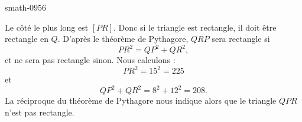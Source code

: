 
\begin{corrige}{smath-0956}

    Le côté le plus long est \( [PR]\). Donc si le triangle est rectangle, il doit être rectangle en \( Q\). D'après le théorème de Pythagore, \( QRP\) sera rectangle si 
    \begin{equation}
        PR^2=QP^2+QR^2,
    \end{equation}
    et ne sera pas rectangle sinon. Nous calculons :
    \begin{equation}
        PR^2=15^2=225
    \end{equation}
    et
    \begin{equation}
        QP^2+QR^2=8^2+12^2=208.
    \end{equation}
    La réciproque du théorème de Pythagore nous indique alors que le triangle \( QPR\) n'est pas rectangle.


\end{corrige}
